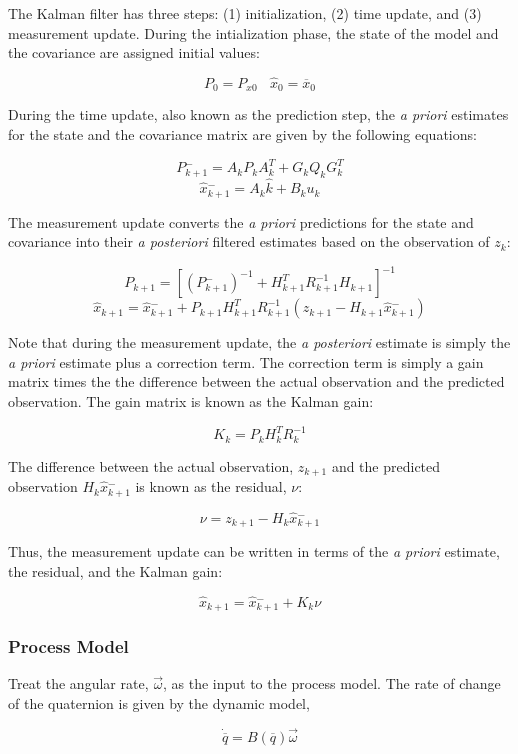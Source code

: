 \documentclass{article}
\begin{document}
\begin{flushleft}
\medskip

The Kalman filter has three steps: (1) initialization, (2) time update, and (3) measurement update. During the intialization phase, the state of the model and the covariance are assigned initial values: 

\[ P_0 = P_{x0}  \ \ \ \  \hat{x}_0 = \overline{x}_0 \]

During the time update, also known as the prediction step, the \textit{a priori} estimates for the state and the covariance matrix are given by the following equations: 

$$ P{^{-}_{k+1}} = A_k P_k A_k^{T} + G_k Q_k G_k^{T} $$
$$ \hat{x}{^{-}_{k+1}} = A_k \hat{k} + B_k u_k $$

The measurement update converts the \textit{a priori} predictions for the state and covariance into their \textit{a posteriori} filtered estimates based on the observation of $z_k$: 

$$ P_{k+1} = [ (P{^{-}_{k+1}})^{-1} + H_{k+1}^{T} R_{k+1}^{-1} H_{k+1} ]^{-1} $$
$$ \hat{x}_{k+1} = \hat{x}{^{-}_{k+1}} + P_{k+1} H_{k+1}^{T} R_{k+1}^{-1} (z_{k+1} - H_{k+1} \hat{x}{^{-}_{k+1}}) $$

Note that during the measurement update, the \textit{a posteriori} estimate is simply the \textit{a priori} estimate plus a correction term. The correction term is simply a gain matrix times the the difference between the actual observation and the predicted observation. The gain matrix is known as the Kalman gain: 

$$ K_k = P_k H_k^{T} R_k^{-1} $$

The difference between the actual observation, $z_{k+1}$ and the predicted observation $H_k \hat{x}{^-_{k+1}}$ is known as the residual, $\nu$:

$$ \nu = z_{k+1} - H_k \hat{x}{^-_{k+1}} $$

Thus, the measurement update can be written in terms of the \textit{a priori} estimate, the residual, and the Kalman gain:

$$ \hat{x}_{k+1} = \hat{x}{^-_{k+1}} + K_k \nu $$

\subsubsection{Process Model}

Treat the angular rate, $\vec{\omega}$, as the input to the process model. The rate of change of the quaternion is given by the dynamic model, 

\[ \dot{\overline{q}} = B(\overline{q}) \vec{\omega} \]


\end{flushleft}
\end{document}
